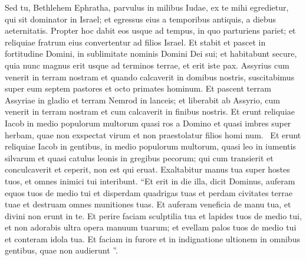\begin{biblechapter}
\begin{biblechapter}
\begin{biblechapter}
\begin{biblechapter}
\begin{biblechapter}
 \verse Sed tu, Bethlehem Ephratha,
 parvulus in milibus Iudae,
 ex te mihi egredietur,
 qui sit dominator in Israel;
 et egressus eius a temporibus antiquis,
 a diebus aeternitatis.
 \verse Propter hoc dabit eos
 usque ad tempus, in quo parturiens pariet;
 et reliquiae fratrum eius
 convertentur ad filios Israel.
 \verse Et stabit et pascet in fortitudine Domini,
 in sublimitate nominis Domini Dei sui;
 et habitabunt secure, quia nunc magnus erit
 usque ad terminos terrae,
 \verse et erit iste pax.
 Assyrius cum venerit in terram nostram
 et quando calcaverit in domibus nostris,
 suscitabimus super eum septem pastores
 et octo primates hominum.
 \verse Et pascent terram Assyriae in gladio et terram Nemrod in lanceis;
 et liberabit ab Assyrio,
 cum venerit in terram nostram
 et cum calcaverit in finibus nostris.
 \verse Et erunt reliquiae Iacob
 in medio populorum multorum
 quasi ros a Domino
 et quasi imbres super herbam,
 quae non exspectat virum
 et non praestolatur filios homi num. 
 \verse Et erunt reliquiae Iacob in gentibus,
 in medio populorum multorum,
 quasi leo in iumentis silvarum
 et quasi catulus leonis in gregibus pecorum;
 qui cum transierit et conculcaverit et ceperit,
 non est qui eruat.
 \verse Exaltabitur manus tua super hostes tuos,
 et omnes inimici tui interibunt.
 \verse “Et erit in die illa,
 dicit Dominus,
 auferam equos tuos de medio tui
 et disperdam quadrigas tuas
 \verse et perdam civitates terrae tuae
 et destruam omnes munitiones tuas.
 \verse Et auferam veneficia de manu tua,
 et divini non erunt in te.
 \verse Et perire faciam sculptilia tua
 et lapides tuos de medio tui,
 et non adorabis ultra
 opera manuum tuarum;
 \verse et evellam palos tuos de medio tui
 et conteram idola tua.
 \verse Et faciam in furore
 et in indignatione ultionem
 in omnibus gentibus,
 quae non audierunt ”.
 

\end{biblechapter}
\end{biblechapter}
\end{biblechapter}
\end{biblechapter}
\end{biblechapter}
